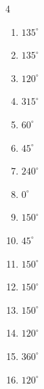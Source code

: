 \begin{multicols}{4}
\begin{enumerate}
  \item $\displaystyle 135^{\circ}$

  \item $\displaystyle 135^{\circ}$

  \item $\displaystyle 120^{\circ}$

  \item $\displaystyle 315^{\circ}$

  \item $\displaystyle 60^{\circ}$

  \item $\displaystyle 45^{\circ}$

  \item $\displaystyle 240^{\circ}$

  \item $\displaystyle 0^{\circ}$
        \phantom{$\displaystyle =0$}

  \item $\displaystyle 150^{\circ}$

  \item $\displaystyle 45^{\circ}$

  \item $\displaystyle 150^{\circ}$

  \item $\displaystyle 150^{\circ}$

  \item $\displaystyle 150^{\circ}$

  \item $\displaystyle 120^{\circ}$

  \item $\displaystyle 360^{\circ}$
        \phantom{$\displaystyle =2\pi$}

  \item $\displaystyle 120^{\circ}$


\end{enumerate}
\end{multicols}
